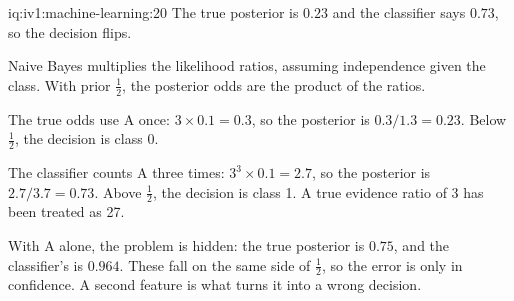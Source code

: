 \begin{solution}{iq:iv1:machine-learning:20}
The true posterior is $0.23$ and the classifier says $0.73$, so the decision flips.

Naive Bayes multiplies the likelihood ratios, assuming independence given the class. With prior $\frac12$, the posterior odds are the product of the ratios.

The true odds use A once: $3 \times 0.1 = 0.3$, so the posterior is $0.3/1.3 = 0.23$. Below $\frac12$, the decision is class 0.

The classifier counts A three times: $3^3 \times 0.1 = 2.7$, so the posterior is $2.7/3.7 = 0.73$. Above $\frac12$, the decision is class 1. A true evidence ratio of 3 has been treated as 27.

With A alone, the problem is hidden: the true posterior is $0.75$, and the classifier's is $0.964$. These fall on the same side of $\frac12$, so the error is only in confidence. A second feature is what turns it into a wrong decision.



\end{solution}

